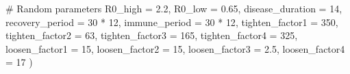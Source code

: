 \documentclass[
  11pt,
  letterpaper,
  DIV=11,
  numbers=noendperiod]{scrartcl}
\newenvironment{Shaded}{\begin{snugshade}}{\end{snugshade}}
\newcommand{\AttributeTok}[1]{\textcolor[rgb]{0.40,0.45,0.13}{#1}}
\newcommand{\CommentTok}[1]{\textcolor[rgb]{0.37,0.37,0.37}{#1}}
\newcommand{\DecValTok}[1]{\textcolor[rgb]{0.68,0.00,0.00}{#1}}
\newcommand{\FloatTok}[1]{\textcolor[rgb]{0.68,0.00,0.00}{#1}}
\newcommand{\NormalTok}[1]{\textcolor[rgb]{0.00,0.23,0.31}{#1}}
\newcommand{\SpecialCharTok}[1]{\textcolor[rgb]{0.37,0.37,0.37}{#1}}
\begin{document}
\begin{Shaded}
\begin{Highlighting}[]
    \CommentTok{\# Random parameters}
    \AttributeTok{R0\_high =} \FloatTok{2.2}\NormalTok{,}
    \AttributeTok{R0\_low =} \FloatTok{0.65}\NormalTok{,}
    \AttributeTok{disease\_duration =} \DecValTok{14}\NormalTok{,}
    \AttributeTok{recovery\_period =} \DecValTok{30} \SpecialCharTok{*} \DecValTok{12}\NormalTok{,}
    \AttributeTok{immune\_period =} \DecValTok{30} \SpecialCharTok{*} \DecValTok{12}\NormalTok{,}
    \AttributeTok{tighten\_factor1 =} \DecValTok{350}\NormalTok{,}
    \AttributeTok{tighten\_factor2 =} \DecValTok{63}\NormalTok{,}
    \AttributeTok{tighten\_factor3 =} \DecValTok{165}\NormalTok{,}
    \AttributeTok{tighten\_factor4 =} \DecValTok{325}\NormalTok{,}
    \AttributeTok{loosen\_factor1 =} \DecValTok{15}\NormalTok{,}
    \AttributeTok{loosen\_factor2 =} \DecValTok{15}\NormalTok{,}
    \AttributeTok{loosen\_factor3 =} \FloatTok{2.5}\NormalTok{,}
    \AttributeTok{loosen\_factor4 =} \DecValTok{17}
\NormalTok{)}
\end{Highlighting}
\end{Shaded}
\end{document}
